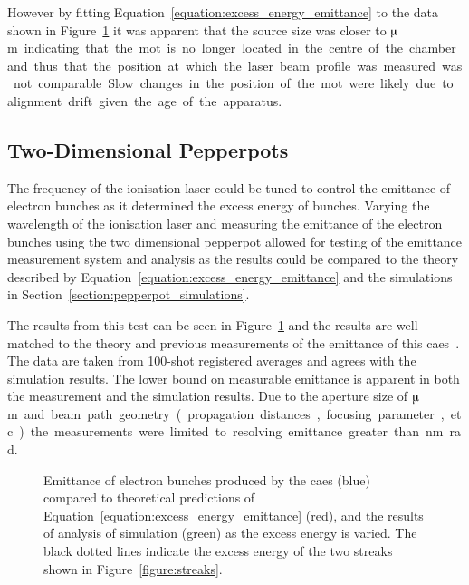 However by fitting Equation~\ref{equation:excess_energy_emittance} to the data shown in Figure~\ref{figure:emittance_vs_theory} it was apparent that the source size was closer to \unit[340]{$\muup$m} indicating that the \gls{mot} is no longer located in the centre of the chamber and thus that the position at which the laser beam profile was measured was not comparable.
Slow changes in the position of the \gls{mot} were likely due to alignment drift given the age of the apparatus.

\subsection{Two-Dimensional Pepperpots}
The frequency of the ionisation laser could be tuned to control the emittance of electron bunches as it determined the excess energy of bunches.
Varying the wavelength of the ionisation laser and measuring the emittance of the electron bunches using the two dimensional pepperpot allowed for testing of the emittance measurement system and analysis as the results could be compared to the theory described by Equation~\ref{equation:excess_energy_emittance} and the simulations in Section~\ref{section:pepperpot_simulations}.

The results from this test can be seen in Figure~\ref{figure:emittance_vs_theory} and the results are well matched to the theory and previous measurements of the emittance of this \gls{caes}~\cite{mcculloch_high-coherence_2013}.
The data are taken from 100-shot registered averages and agrees with the simulation results.
The lower bound on measurable emittance is apparent in both the measurement and the simulation results.
Due to the aperture size of \unit[50]{$\muup$m} and beam path geometry (propagation distances, focusing parameter, etc.) the measurements were limited to resolving emittance greater than \unit[41]{nm rad}.

\begin{figure}
    \center
    
    \caption{Emittance of electron bunches produced by the \gls{caes} (blue) compared to theoretical predictions of Equation~\ref{equation:excess_energy_emittance} (red), and the results of analysis of simulation (green) as the excess energy is varied. The black dotted lines indicate the excess energy of the two streaks shown in Figure~\ref{figure:streaks}.}
    \label{figure:emittance_vs_theory}
\end{figure}


